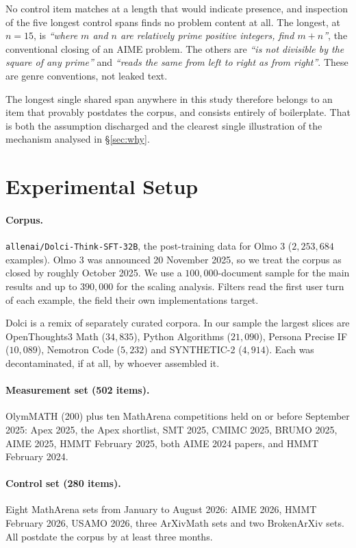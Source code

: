 \documentclass[11pt]{article}
\begin{document}
No control item matches at a length that would indicate presence, and inspection
of the five longest control spans finds no problem content at all. The longest,
at $n{=}15$, is \emph{``where $m$ and $n$ are relatively prime positive integers,
find $m+n$''}, the conventional closing of an AIME problem. The others are
\emph{``is not divisible by the square of any prime''} and \emph{``reads the same
from left to right as from right''}. These are genre conventions, not leaked text.

The longest single shared span anywhere in this study therefore belongs to an item
that provably postdates the corpus, and consists entirely of boilerplate. That is
both the assumption discharged and the clearest single illustration of the
mechanism analysed in \S\ref{sec:why}.

\section{Experimental Setup}

\paragraph{Corpus.}
\texttt{allenai/Dolci-Think-SFT-32B}, the post-training data for Olmo 3
($2{,}253{,}684$ examples). Olmo 3 was announced 20 November 2025, so we treat the
corpus as closed by roughly October 2025. We use a $100{,}000$-document sample for
the main results and up to $390{,}000$ for the scaling analysis. Filters read the
first user turn of each example, the field their own implementations target.

Dolci is a remix of separately curated corpora. In our sample the largest slices
are OpenThoughts3 Math ($34{,}835$), Python Algorithms ($21{,}090$), Persona
Precise IF ($10{,}089$), Nemotron Code ($5{,}232$) and SYNTHETIC-2 ($4{,}914$).
Each was decontaminated, if at all, by whoever assembled it.

\paragraph{Measurement set (502 items).}
OlymMATH (200) plus ten MathArena competitions held on or before September 2025:
Apex 2025, the Apex shortlist, SMT 2025, CMIMC 2025, BRUMO 2025, AIME 2025,
HMMT February 2025, both AIME 2024 papers, and HMMT February 2024.

\paragraph{Control set (280 items).}
Eight MathArena sets from January to August 2026: AIME 2026, HMMT February 2026,
USAMO 2026, three ArXivMath sets and two BrokenArXiv sets. All postdate the
corpus by at least three months.
\end{document}
